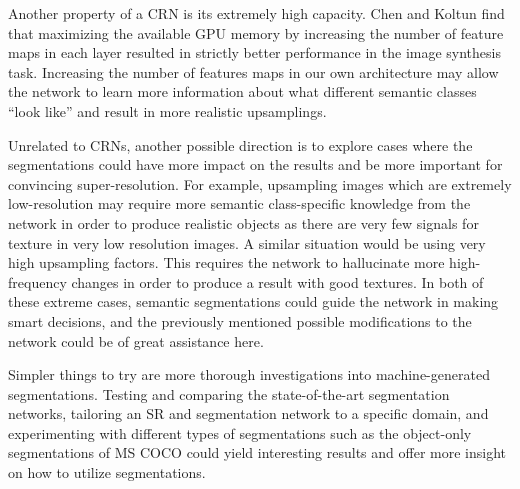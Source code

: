 \documentclass[10pt,twocolumn,letterpaper]{article}
\begin{document}
Another property of a CRN is its extremely high capacity. Chen and Koltun find
that maximizing the available GPU memory by increasing the number of feature
maps in each layer resulted in strictly better performance in the image
synthesis task.  Increasing the number of features maps in our own architecture
may allow the network to learn more information about what different semantic
classes ``look like'' and result in more realistic upsamplings.

Unrelated to CRNs, another possible direction is to explore cases where the
segmentations could have more impact on the results and be more important for
convincing super-resolution. For example, upsampling images which are extremely
low-resolution may require more semantic class-specific knowledge from the
network in order to produce realistic objects as there are very few signals for
texture in very low resolution images. A similar situation would be using very
high upsampling factors. This requires the network to hallucinate more
high-frequency changes in order to produce a result with good textures. In both
of these extreme cases, semantic segmentations could guide the network in
making smart decisions, and the previously mentioned possible modifications to
the network could be of great assistance here.

Simpler things to try are more thorough investigations into machine-generated
segmentations. Testing and comparing the state-of-the-art segmentation
networks, tailoring an SR and segmentation network to a specific domain, and
experimenting with different types of segmentations such as the object-only
segmentations of MS COCO \cite{MSCOCO} could yield interesting results and
offer more insight on how to utilize segmentations.

{\small


}
\end{document}
